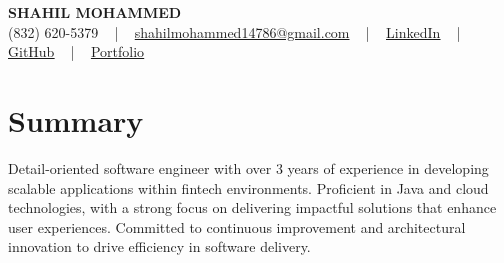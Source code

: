\documentclass[letterpaper,10pt]{article}
\begin{document}
\begin{center}
    {\fontsize{14pt}{12pt}\selectfont \textbf{\MakeUppercase{Shahil Mohammed}}}\\ \vspace{2pt}
    \fontsize{10pt}{12pt}\selectfont (832) 620-5379 ~ | ~ \href{mailto:shahilmohammed14786@gmail.com}{shahilmohammed14786@gmail.com} ~ | ~  
    \href{https://www.linkedin.com/in/shahil-mohammed-9652931a1/}{\color{blue}\underline{LinkedIn}}  ~ | ~ 
    \href{https://github.com/freakbeast14}{\color{blue}\underline{GitHub}} ~ | ~ 
    \href{https://shahil-mohammed.netlify.app/}{\color{blue}\underline{Portfolio}}
    \vspace{-8pt}
\end{center}

\section{Summary}
\vspace{-2pt}\fontsize{8pt}{9pt}\selectfont
Detail-oriented software engineer with over 3 years of experience in developing scalable applications within fintech environments. Proficient in Java and cloud technologies, with a strong focus on delivering impactful solutions that enhance user experiences. Committed to continuous improvement and architectural innovation to drive efficiency in software delivery.
 \vspace{-5pt}
 
\vspace{-2pt}
\end{document}
